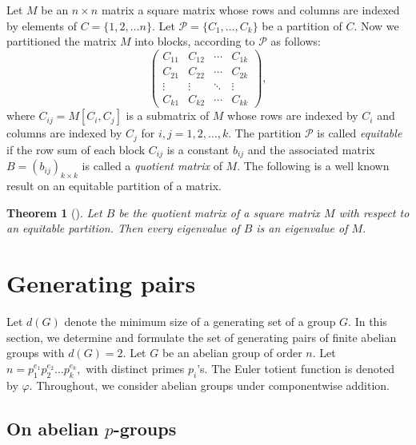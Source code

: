 \documentclass[11pt]{article}
\def \P {{\mathcal P}}
\newtheorem{theorem}{Theorem}[section]
\begin{document}
Let $M$ be an $n \times n$ matrix a square matrix whose rows and columns are indexed by elements of $C=\{1,2,\dots n\}.$ Let $\P=\{C_1,\ldots, C_k\}$ be a partition of $C$. Now we partitioned the matrix $M$ into blocks, according to $\P$ as follows:
$$\begin{pmatrix}
    C_{11}&C_{12}&\cdots&C_{1k}\\
    C_{21}&C_{22}&\cdots&C_{2k}\\
    \vdots&\vdots&\ddots&\vdots\\
    C_{k1}&C_{k2}&\cdots&C_{kk}
\end{pmatrix},$$
where $C_{ij}=M[C_i,C_j]$ is a submatrix of $M$ whose rows are indexed by $C_i$ and columns are indexed by $C_j$ for $i,j=1,2,\dots,k.$ The partition $\P$ is called \emph{equitable} if the row sum of each block $C_{ij}$  is a constant $b_{ij}$ and the associated matrix $B=(b_{ij})_{k\times k}$ is called a \emph{quotient matrix} of $M.$ The following is a well known result on an equitable partition of a matrix.

\begin{theorem}[\cite{book}]\label{thm:specA}
Let $B$ be the quotient matrix of a square matrix $M$ with respect to an equitable 
partition. Then every eigenvalue of $B$ is an eigenvalue of $M$.
\end{theorem}

\section{{Generating pairs}}\label{sec:3}
Let $d(G)$ denote the minimum size of a generating set of a group $G.$ In this section, we determine and formulate the set of generating pairs of finite abelian groups with $d(G)=2.$
Let $G$ be an abelian group of order $n.$ Let $n=p_1^{e_1}p_2^{e_2}\dots p_k^{e_k},$ with distinct primes $p_i$'s. The Euler totient 
function is denoted by $\varphi.$ Throughout, we consider abelian groups under componentwise addition.


\subsection{On abelian \texorpdfstring{$p$}{p}-groups}
\end{document}
